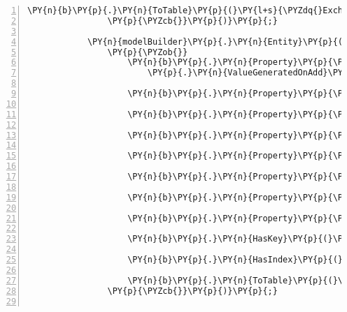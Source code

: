 \begin{Verbatim}[commandchars=\\\{\},numbers=left,firstnumber=1,stepnumber=1,numberblanklines=0]
                    \PY{n}{b}\PY{p}{.}\PY{n}{ToTable}\PY{p}{(}\PY{l+s}{\PYZdq{}Exchanges\PYZdq{}}\PY{p}{)}\PY{p}{;}
                \PY{p}{\PYZcb{}}\PY{p}{)}\PY{p}{;}

            \PY{n}{modelBuilder}\PY{p}{.}\PY{n}{Entity}\PY{p}{(}\PY{l+s}{\PYZdq{}CryptoStats.Models.Stat\PYZdq{}}\PY{p}{,} \PY{n}{b} \PY{p}{=}\PY{p}{\PYZgt{}}
                \PY{p}{\PYZob{}}
                    \PY{n}{b}\PY{p}{.}\PY{n}{Property}\PY{p}{\PYZlt{}}\PY{k+kt}{int}\PY{p}{\PYZgt{}}\PY{p}{(}\PY{l+s}{\PYZdq{}StatId\PYZdq{}}\PY{p}{)}
                        \PY{p}{.}\PY{n}{ValueGeneratedOnAdd}\PY{p}{(}\PY{p}{)}\PY{p}{;}

                    \PY{n}{b}\PY{p}{.}\PY{n}{Property}\PY{p}{\PYZlt{}}\PY{k+kt}{int}\PY{p}{\PYZgt{}}\PY{p}{(}\PY{l+s}{\PYZdq{}ExchangeId\PYZdq{}}\PY{p}{)}\PY{p}{;}

                    \PY{n}{b}\PY{p}{.}\PY{n}{Property}\PY{p}{\PYZlt{}}\PY{k+kt}{decimal}\PY{p}{\PYZgt{}}\PY{p}{(}\PY{l+s}{\PYZdq{}HighestLatestDiff\PYZdq{}}\PY{p}{)}\PY{p}{;}

                    \PY{n}{b}\PY{p}{.}\PY{n}{Property}\PY{p}{\PYZlt{}}\PY{n}{TimeSpan}\PY{p}{\PYZgt{}}\PY{p}{(}\PY{l+s}{\PYZdq{}avgDeclineTime\PYZdq{}}\PY{p}{)}\PY{p}{;}

                    \PY{n}{b}\PY{p}{.}\PY{n}{Property}\PY{p}{\PYZlt{}}\PY{k+kt}{decimal}\PY{p}{\PYZgt{}}\PY{p}{(}\PY{l+s}{\PYZdq{}avgDiff\PYZdq{}}\PY{p}{)}\PY{p}{;}

                    \PY{n}{b}\PY{p}{.}\PY{n}{Property}\PY{p}{\PYZlt{}}\PY{n}{TimeSpan}\PY{p}{\PYZgt{}}\PY{p}{(}\PY{l+s}{\PYZdq{}avgGrowthTime\PYZdq{}}\PY{p}{)}\PY{p}{;}

                    \PY{n}{b}\PY{p}{.}\PY{n}{Property}\PY{p}{\PYZlt{}}\PY{n}{DateTime}\PY{p}{\PYZgt{}}\PY{p}{(}\PY{l+s}{\PYZdq{}endDate\PYZdq{}}\PY{p}{)}\PY{p}{;}

                    \PY{n}{b}\PY{p}{.}\PY{n}{Property}\PY{p}{\PYZlt{}}\PY{n}{DateTime}\PY{p}{\PYZgt{}}\PY{p}{(}\PY{l+s}{\PYZdq{}startDate\PYZdq{}}\PY{p}{)}\PY{p}{;}

                    \PY{n}{b}\PY{p}{.}\PY{n}{HasKey}\PY{p}{(}\PY{l+s}{\PYZdq{}StatId\PYZdq{}}\PY{p}{)}\PY{p}{;}

                    \PY{n}{b}\PY{p}{.}\PY{n}{HasIndex}\PY{p}{(}\PY{l+s}{\PYZdq{}ExchangeId\PYZdq{}}\PY{p}{)}\PY{p}{;}

                    \PY{n}{b}\PY{p}{.}\PY{n}{ToTable}\PY{p}{(}\PY{l+s}{\PYZdq{}Stats\PYZdq{}}\PY{p}{)}\PY{p}{;}
                \PY{p}{\PYZcb{}}\PY{p}{)}\PY{p}{;}


\end{Verbatim}
